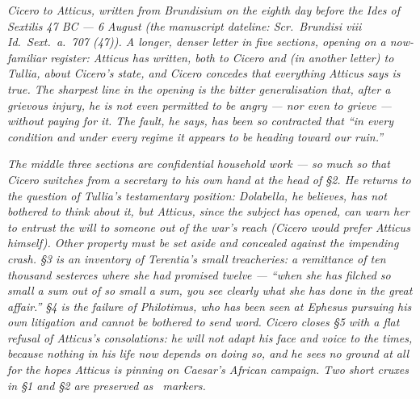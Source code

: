 
\textit{Cicero to Atticus, written from Brundisium on
the eighth day before the Ides of Sextilis 47 BC ---
6 August (the manuscript dateline: \textit{Scr.\ Brundisi
viii Id.\ Sext.\ a.\ 707 (47)}). A longer, denser letter
in five sections, opening on a now-familiar register:
Atticus has written, both to Cicero and (in another
letter) to Tullia, about Cicero's state, and Cicero
concedes that everything Atticus says is true. The
sharpest line in the opening is the bitter generalisation
that, after a grievous injury, he is not even permitted
to be angry --- nor even to grieve --- without paying
for it. The fault, he says, has been so contracted that
``in every condition and under every regime it appears
to be heading toward our ruin.''}

\textit{The middle three sections are confidential
household work --- so much so that Cicero switches
from a secretary to his own hand at the head of \S2.
He returns to the question of Tullia's testamentary
position: Dolabella, he believes, has not bothered
to think about it, but Atticus, since the subject has
opened, can warn her to entrust the will to someone
out of the war's reach (Cicero would prefer Atticus
himself). Other property must be set aside and
concealed against the impending crash. \S3 is an
inventory of Terentia's small treacheries: a remittance
of ten thousand sesterces where she had promised
twelve --- ``when she has filched so small a sum out
of so small a sum, you see clearly what she has done
in the great affair.'' \S4 is the failure of Philotimus,
who has been seen at Ephesus pursuing his own
litigation and cannot be bothered to send word.
Cicero closes \S5 with a flat refusal of Atticus's
consolations: he will not adapt his face and voice
to the times, because nothing in his life now depends
on doing so, and he sees no ground at all for the
hopes Atticus is pinning on Caesar's African
campaign. Two short cruxes in \S1 and \S2 are
preserved as \dag\ markers.}
